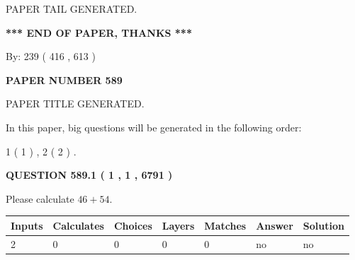 \documentclass[12pt]{article}
\begin{document}
   
   
   
   
   
 \vspace{0.2in}
 
   
   
\vspace{2.0in} PAPER TAIL GENERATED.
   
   
   
   
\vspace{1.0in} 
{\textbf{\large{ *** END OF PAPER, THANKS *** }}} 
   
   
\hspace{1.0in} By: 
 239 ( 416 ,  613 )
   
   
   
   
\newpage 
\setcounter{page}{ 
   589001 } 
   
   
   
   
 {\textbf{ \Large{ PAPER NUMBER  589  }}}
   
   
\vspace{0.2in}
   
   
   
   
   
   
   
   
 \vspace{0.2in}
 
 
 
 
   
   
 PAPER TITLE GENERATED.
   
   
   
\vspace{0.2in}
   
In this paper, big questions will be generated in the following order: 
   
   
   1 ( 1 )
 ,
   2 ( 2 )
 .
  
\vspace{0.2in}
  
{\textbf{\Large{QUESTION
589.1 
 ( 1 , 1 , 6791 )
}}}
  
  
 
Please calculate $ %
46 +  %
54 $.
 
 
   
   
   
   
\noindent\begin{tabular}{|l|l|l|l|l|l|l|}
 \hline
Inputs & Calculates & Choices & Layers & Matches & Answer & Solution \\ \hline
 2  & 
 0  & 
 0
  & 
 0  & 
 0  & 
  no & 
  no 
  \\ \hline
 \end{tabular}
   
\end{document}
